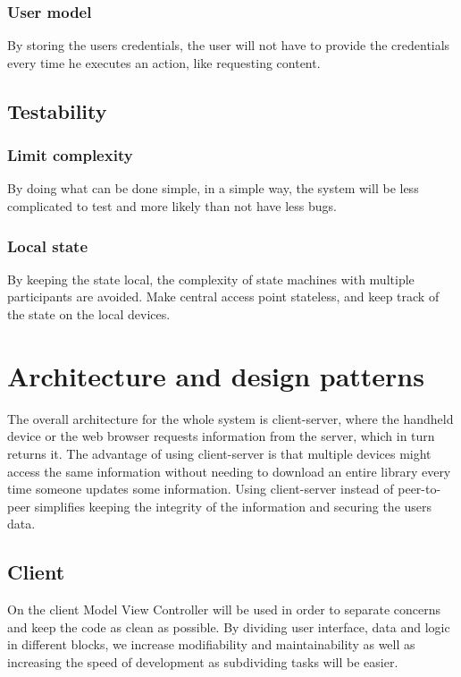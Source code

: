 \documentclass[11pt]{book}
\begin{document}
\subsubsection{User model}
By storing the users credentials, the user will not have to provide the credentials every time he executes an action, like requesting content.

\subsection{Testability}

\subsubsection{Limit complexity}
By doing what can be done simple, in a simple way, the system will be less complicated to test and more likely than not have less bugs.

\subsubsection{Local state}
By keeping the state local, the complexity of state machines with multiple participants are avoided. Make central access point stateless, and keep track of the state on the local devices.

\section{Architecture and design patterns}

The overall architecture for the whole system is client-server, where the handheld device or the web browser requests information from the server, which in turn returns it. The advantage of using client-server is that multiple devices might access the same information without needing to download an entire library every time someone updates some information. Using client-server instead of peer-to-peer simplifies keeping the integrity of the information and securing the users data.

\subsection{Client}
On the client Model View Controller will be used in order to separate concerns and keep the code as clean as possible. By dividing user interface, data and logic in different blocks, we increase modifiability and maintainability as well as increasing the speed of development as subdividing tasks will be easier.
\end{document}
